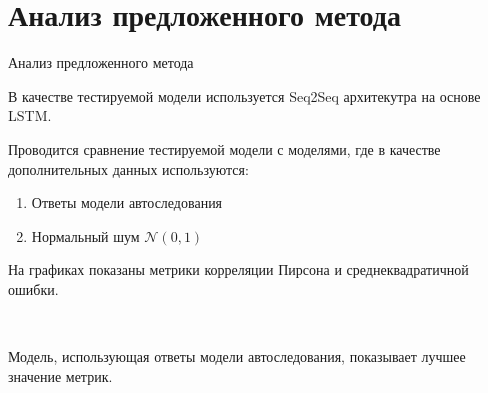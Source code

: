 \documentclass[10pt,pdf,hyperref={unicode}]{beamer}
\begin{document}
\section{Анализ предложенного метода}
\begin{frame}{Анализ предложенного метода}

В качестве тестируемой модели используется Seq2Seq архитекутра на основе LSTM.

Проводится сравнение тестируемой модели с моделями, где в качестве дополнительных данных используются:
\begin{enumerate}[1)]
    \item Ответы модели автоследования
    \item Нормальный шум $ \mathcal{N}(0, 1) $
\end{enumerate}

На графиках показаны метрики корреляции Пирсона и среднеквадратичной ошибки.

\begin{figure}[h!t]\center
{}
\\
\end{figure}

Модель, использующая ответы модели автоследования, показывает лучшее значение метрик.

\end{frame}

\end{document}
